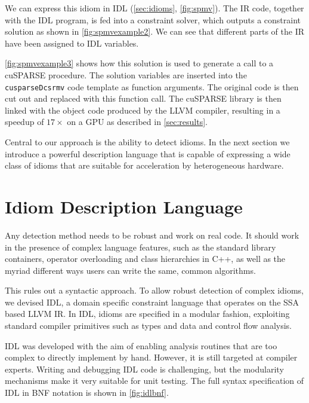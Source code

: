     We can express this idiom in IDL (\autoref{sec:idioms}, \autoref{fig:spmv}).
    The IR code, together with the IDL program, is fed into a constraint solver,
    which outputs a constraint solution as shown in \autoref{fig:spmvexample2}.
    We can see that different parts of the IR have been assigned to IDL
    variables.

    \autoref{fig:spmvexample3} shows how this solution is used to generate a
    call to a cuSPARSE procedure.
    The solution variables are inserted into the {\tt cusparseDcsrmv} code
    template as function arguments. 
    The original code is then cut out and replaced with this function call.
    The cuSPARSE library is then linked with the object code produced by the
    LLVM compiler, resulting in a speedup of $17\times$ on a GPU as described in
    \autoref{sec:results}.

    Central to our approach is the ability to detect idioms.
    In the next section we introduce a powerful description language that is
    capable of expressing a wide class of idioms that are suitable for
    acceleration by heterogeneous hardware.

\section{Idiom Description Language}
\label{sec:idl}

\begin{figure}[p]
    
    \label{fig:idlbnf}
\end{figure}

    Any detection method needs to be robust and work on real code.
    It should work in the presence of complex language features, such as the
    standard library containers, operator overloading and class hierarchies in
    C++, as well as the myriad different ways users can write the same, common
    algorithms.

    This rules out a syntactic approach.
    To allow robust detection of complex idioms, we devised IDL, a domain
    specific constraint language that operates on the SSA based LLVM IR.
    In IDL, idioms are specified in a modular fashion, exploiting standard
    compiler primitives such as types and data and control flow analysis.

    IDL was developed with the aim of enabling analysis routines that are too
    complex to directly implement by hand.
    However, it is still targeted at compiler experts.
    Writing and debugging IDL code is challenging, but the modularity mechanisms
    make it very suitable for unit testing.
    The full syntax specification of IDL in BNF notation is shown in
    \autoref{fig:idlbnf}.

